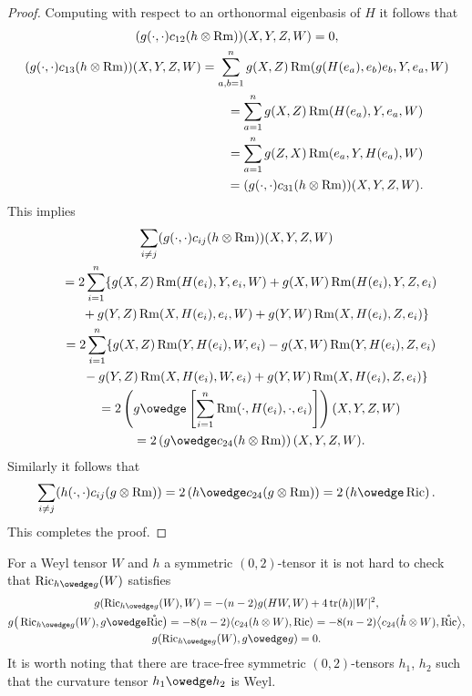 \documentclass[pdftex]{sigma}
\numberwithin{equation}{section}
\newcommand{\Ric} {\operatorname{Ric}}
\newcommand{ \tr } {\operatorname{tr}}
\newcommand{\Rm} {\operatorname{Rm}}
\begin{document}
\begin{proof}
Computing with respect to an orthonormal eigenbasis of $H$ it follows that
\begin{gather*}
( g( \cdot, \cdot ) c_{12}(h \otimes \Rm)) (X, Y, Z, W) =   0, \\
( g( \cdot, \cdot ) c_{13}(h \otimes \Rm)) (X, Y, Z, W) =
  \sum_{a,b=1}^n g(X,Z) \Rm(g(H(e_a),e_b) e_b, Y, e_a, W) \\
\hphantom{( g( \cdot, \cdot ) c_{13}(h \otimes \Rm)) (X, Y, Z, W)}{} =   \sum_{a=1}^n g(X,Z) \Rm(H(e_a), Y, e_a, W) \\
\hphantom{( g( \cdot, \cdot ) c_{13}(h \otimes \Rm)) (X, Y, Z, W)}{} =   \sum_{a=1}^n g(Z,X) \Rm(e_a, Y, H(e_a), W) \\
\hphantom{( g( \cdot, \cdot ) c_{13}(h \otimes \Rm)) (X, Y, Z, W)}{} =   ( g( \cdot, \cdot ) c_{31}(h \otimes \Rm)) (X, Y, Z, W).
\end{gather*}
This implies
\begin{gather*}
\sum_{i \neq j} ( g( \cdot, \cdot )   c_{ij}(h \otimes \Rm)) (X, Y, Z, W) \\
\qquad{}=   2 \sum_{i=1}^n \lbrace g(X,Z) \Rm(H(e_i), Y, e_i, W) + g(X,W) \Rm(H(e_i), Y, Z, e_i) \\
\qquad\quad{} + g(Y,Z) \Rm(X, H(e_i), e_i, W ) + g(Y,W) \Rm(X, H(e_i), Z, e_i) \rbrace \\
\qquad {}=   2 \sum_{i=1}^n \lbrace g(X,Z) \Rm(Y, H(e_i), W, e_i) - g(X,W) \Rm(Y, H(e_i), Z, e_i) \\
\qquad\quad{}- g(Y,Z) \Rm( X, H(e_i), W, e_i) + g(Y,W) \Rm(X, H(e_i), Z, e_i) \rbrace \\
\qquad {}=   2 \left( g \owedge \left[ \sum_{i=1}^n \Rm( \cdot, H(e_i), \cdot, e_i) \right] \right) (X, Y, Z,W) \\
\qquad {} =   2 \left( g \owedge c_{24} ( h \otimes \Rm) \right) (X, Y, Z,W).
\end{gather*}
Similarly it follows that
\begin{gather*}
\sum_{i \neq j} ( h( \cdot, \cdot ) c_{ij}(g \otimes \Rm))
= 2 \left( h \owedge c_{24} ( g \otimes \Rm) \right)
= 2 \left( h \owedge \Ric \right).
\end{gather*}
This completes the proof.
\end{proof}

\begin{Remark} For a Weyl tensor $W$ and $h$ a symmetric $(0,2)$-tensor it is not hard to check that $\Ric_{h \owedge g}(W)$ satisfies
\begin{gather*}
g( \Ric_{h \owedge g}(W),W)   = - (n-2) g( HW, W) + 4 \tr(h) |W|^2, \\
g\big( \Ric_{h \owedge g}(W), g \owedge \mathring{\Ric}\big)
  = - 8(n-2)  \langle c_{24}(h \otimes W), \Ric \rangle
  = - 8(n-2) \big\langle c_{24}(\mathring{h} \otimes W), \mathring{\Ric} \big\rangle, \\
g( \Ric_{h \owedge g}(W), g \owedge g)   = 0.
\end{gather*}
It is worth noting that there are trace-free symmetric $(0,2)$-tensors $h_1$, $h_2$ such that the curvature tensor $h_1 \owedge h_2$ is Weyl.
\end{Remark}
\end{document}

